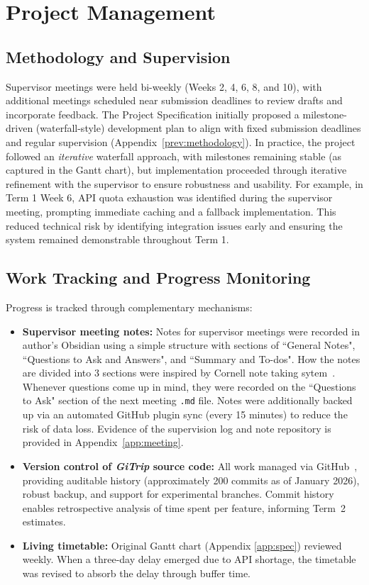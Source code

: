 \section{Project Management}
\label{sec:project-management}

\subsection{Methodology and Supervision}
\label{sec:methodology}
Supervisor meetings were held bi-weekly (Weeks 2, 4, 6, 8, and 10), with additional meetings scheduled near submission deadlines to review drafts and incorporate feedback. The Project Specification initially proposed a milestone-driven (waterfall-style) development plan to align with fixed submission deadlines and regular supervision (Appendix~\ref{prev:methodology}). In practice, the project followed an \textit{iterative} waterfall approach, with milestones remaining stable (as captured in the Gantt chart), but implementation proceeded through iterative refinement with the supervisor to ensure robustness and usability. For example, in Term 1 Week 6, API quota exhaustion was identified during the supervisor meeting, prompting immediate caching and a fallback implementation. This reduced technical risk by identifying integration issues early and ensuring the system remained demonstrable throughout Term 1.

\subsection{Work Tracking and Progress Monitoring}
\label{sec:work-tracking}

Progress is tracked through complementary mechanisms:

\begin{itemize}
    \item \textbf{Supervisor meeting notes:} Notes for supervisor meetings were recorded in author's Obsidian using a simple structure with sections of  ``General Notes", ``Questions to Ask and Answers", and ``Summary and To-dos". How the notes are divided into 3 sections were inspired by Cornell note taking sytem~\cite{cornell-notes}. Whenever questions come up in mind, they were recorded on the ``Questions to Ask" section of the next meeting \texttt{.md} file. Notes were additionally backed up via an automated GitHub plugin sync (every 15 minutes) to reduce the risk of data loss. Evidence of the supervision log and note repository is provided in Appendix~\ref{app:meeting}.
    \item \textbf{Version control of \textit{GiTrip} source code:} All work managed via GitHub~\cite{github}, providing auditable history (approximately 200 commits as of January 2026), robust backup, and support for experimental branches. Commit history enables retrospective analysis of time spent per feature, informing Term~2 estimates.
    \item \textbf{Living timetable:} Original Gantt chart (Appendix \ref{app:spec}) reviewed weekly. When a three-day delay emerged due to API shortage, the timetable was revised to absorb the delay through buffer time.    
\end{itemize}